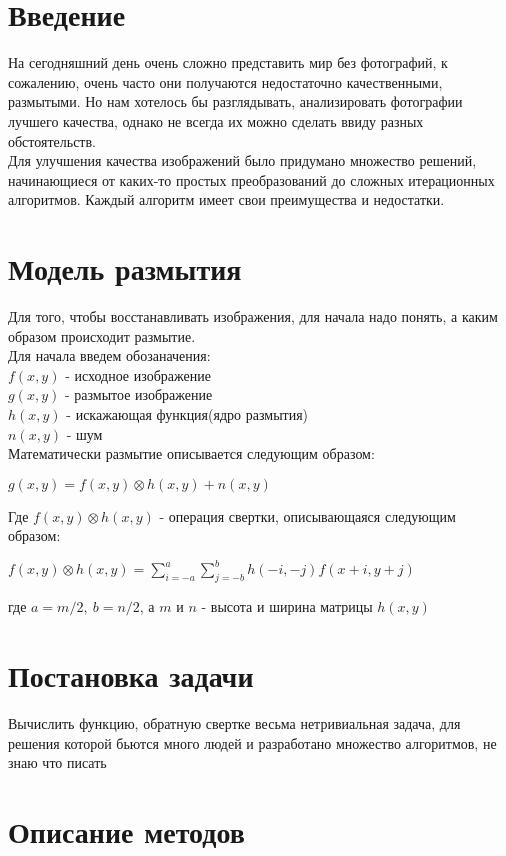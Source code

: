 \documentclass{article}
\begin{document}
	\section{Введение}
	На сегодняшний день очень сложно представить мир без фотографий, к сожалению, очень часто они получаются недостаточно качественными, размытыми. Но нам хотелось бы разглядывать, анализировать фотографии лучшего качества, однако не всегда их можно сделать  ввиду разных обстоятельств.\\
	Для улучшения качества изображений было придумано множество решений, начинающиеся от каких-то простых преобразований до сложных итерационных алгоритмов. Каждый алгоритм имеет свои преимущества и недостатки. 
	\section{Модель размытия}
	Для того, чтобы восстанавливать изображения, для начала надо понять, а каким образом происходит размытие. \\
	Для начала введем обозаначения:\\
	$f(x, y)$ - исходное изображение\\
	$g(x, y)$ - размытое изображение\\
	$h(x, y)$ - искажающая функция(ядро размытия)\\
	$n(x, y)$ - шум\\
	Математически размытие описывается следующим образом:\\
	\begin{center}
	$g(x, y) = f(x, y) \otimes h(x, y) + n(x, y)$\\
	\end{center}
	Где $ f(x ,y) \otimes h(x, y)$ - операция свертки, описывающаяся следующим образом:
	\begin{center}
		$f(x, y) \otimes h(x, y) = \sum\limits_{i=-a}^{a}\sum\limits_{j=-b}^{b} h(-i, -j)f(x+i, y+j) $
	\end{center}
	где $a=m/2, ~ b=n/2$, а $m$ и $n$ - высота и ширина матрицы $h(x, y)$ 
	\section{Постановка задачи}
	Вычислить функцию, обратную свертке весьма нетривиальная задача, для решения которой бьются много людей и разработано множество алгоритмов, не знаю что писать
	\section{Описание методов}
\end{document}

